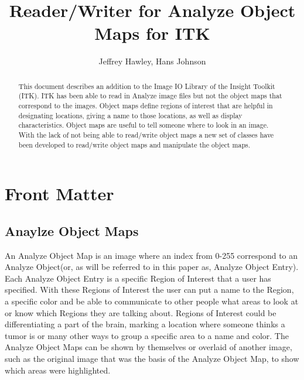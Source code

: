 \documentclass{InsightArticle}
\title{Reader/Writer for Analyze Object Maps for ITK}
\author{Jeffrey Hawley, Hans Johnson }
\begin{document}
\ifpdf
\else
\fi


\maketitle


\ifhtml
\chapter*{Front Matter\label{front}}
\fi


\begin{abstract}
\noindent
This document describes an addition to the Image IO Library of the Insight Toolkit (ITK).
ITK has been able to read in Analyze image files but not the object maps that correspond
to the images.  Object maps define regions of interest that are helpful in designating locations, giving a name to those
locations, as well as display characteristics.  Object maps are useful to tell
someone where to look in an image.  With the lack of not being able to read/write object maps a new set of classes have been
developed to read/write object maps and manipulate the object maps.
\end{abstract}

\tableofcontents

\section{Anaylze Object Maps}
An Analyze Object Map is an image where an index from 0-255 correspond to an Analyze Object(or, as will be referred to in this paper as, Analyze Object Entry).  Each Analyze Object Entry
is a specific Region of Interest that a user has specified. With these Regions of Interest the user can put a name to the Region, a specific color and be able to communicate to other people what areas to look at or know which Regions they are talking about.  Regions of Interest could be differentiating a part of the brain, marking a location where someone thinks a tumor is or many other ways to group a specific area to a name and color.  The Analyze Object Maps can be shown by themselves or overlaid of another image, such as the original image that was the basis of the Analyze Object Map, to show which areas were highlighted.
\end{document}

